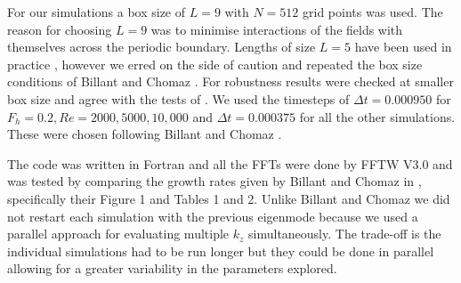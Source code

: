 
For our simulations a box size of $L=9$ with $N=512$ grid points was used. The reason for choosing $L=9$ was to minimise interactions of the fields with themselves across the periodic boundary. Lengths of size $L=5$ have been used in practice \cite{augier2012}, however we erred on the side of caution and repeated the box size conditions of Billant and Chomaz \cite{bc2000c}. For robustness results were checked at smaller box size and agree with the tests of \cite{bc2000c}. We used the timesteps of $\Delta t=0.000950$ for $F_{h}=0.2,Re=2000,5000,10{,}000$ and $\Delta t=0.000375$ for all the other simulations. These were chosen following Billant and Chomaz \cite{bc2000c}. 


The code was written in Fortran and all the FFTs were done by FFTW V3.0 \cite{fftw} and was tested by comparing the growth rates given by Billant and Chomaz in \cite{bc2000c}, specifically their Figure  1 and Tables 1 and 2. Unlike Billant and Chomaz \cite{bc2000c} we did not restart each simulation with the previous eigenmode because we used a parallel approach for evaluating multiple $k_{z}$ simultaneously. The trade-off is the individual simulations had to be run longer but they could be done in parallel allowing for a greater variability in the parameters explored. 



